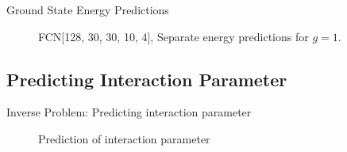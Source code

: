 \documentclass{beamer}
\begin{document}
\begin{frame}{Ground State Energy Predictions}

\begin{figure}[H]
    \centering
    \begin{subfigure}[t]{0.45\textwidth}
		\centering
        
		\label{fig:a}
    \end{subfigure}
    \begin{subfigure}[t]{0.45\textwidth}
		\centering
        
		\label{fig:b}
    \end{subfigure}    
    \begin{subfigure}[t]{0.45\textwidth}
        \centering
        
		\label{fig:c}
    \end{subfigure}
    \begin{subfigure}[t]{0.45\textwidth}
        \centering
        
		\label{fig:c}
    \end{subfigure}
	\caption{FCN[128, 30, 30, 10, 4], Separate energy predictions for $g = 1$.}
\label{fig:FFN-g-1-S}
\end{figure}
\end{frame}

\subsection{Predicting Interaction Parameter}
\begin{frame}{Inverse Problem: Predicting interaction parameter}

\begin{figure}[H]
    \centering
    \begin{subfigure}[t]{0.45\textwidth}
		\centering
    	
		\label{fig:a}
    \end{subfigure}
    \begin{subfigure}[t]{0.45\textwidth}
        \centering
    	
		\label{fig:b}
    \end{subfigure}
    \begin{subfigure}[t]{0.45\textwidth}
        \centering
		
		\label{fig:c}
    \end{subfigure}
    \begin{subfigure}[t]{0.45\textwidth}
        \centering
		
		\label{fig:d}
	    \end{subfigure}
	\caption{Prediction of interaction parameter}
\end{figure}
\end{frame}
\end{document}
